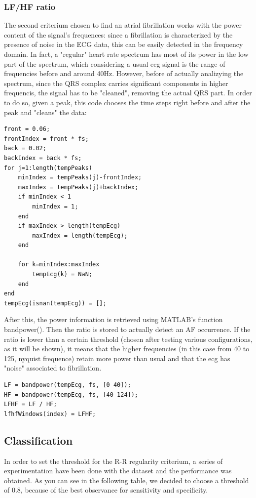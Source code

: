 \documentclass[a4paper,titlepage]{article}
\begin{document}
\subsubsection{LF/HF ratio}
The second criterium chosen to find an atrial fibrillation works with the power content of the signal's frequences: since a fibrillation is characterized by the presence of noise in the ECG data, this can be easily detected in the frequency domain.
In fact, a "regular" heart rate spectrum has most of its power in the low part of the spectrum, which considering a usual ecg signal is the range of frequencies  before and around 40Hz.
However, before of actually analizying the spectrum, since the QRS complex carries significant components in higher frequencis, the signal has to be "cleaned", removing the actual QRS part.
In order to do so, given a peak, this code chooses the time steps right before and after the peak and "cleans" the data:

\begin{lstlisting}
front = 0.06;
frontIndex = front * fs;
back = 0.02;
backIndex = back * fs;
for j=1:length(tempPeaks)
	minIndex = tempPeaks(j)-frontIndex;
	maxIndex = tempPeaks(j)+backIndex;
	if minIndex < 1
		minIndex = 1;
	end
	if maxIndex > length(tempEcg)
		maxIndex = length(tempEcg);
	end

	for k=minIndex:maxIndex
		tempEcg(k) = NaN;
	end
end
tempEcg(isnan(tempEcg)) = [];
\end{lstlisting}

After this, the power information is retrieved using MATLAB's function bandpower(). Then the ratio is stored to actually detect an AF occurrence. If the ratio is lower than a certain threshold (chosen after testing various configurations, as it will be shown), it means that the higher frequencies (in this case from 40 to 125, nyquist frequence) retain more power than usual and that the ecg has "noise" associated to fibrillation.

\begin{lstlisting}
LF = bandpower(tempEcg, fs, [0 40]);
HF = bandpower(tempEcg, fs, [40 124]);
LFHF = LF / HF;
lfhfWindows(index) = LFHF;
\end{lstlisting}


\subsection{Classification}
In order to set the threshold for the R-R regularity criterium, a series of experimentation have been done with the dataset and the performance was obtained. As you can see in the following table, we decided to choose a threshold of 0.8, because of the best observance for sensitivity and specificity.
\end{document}
